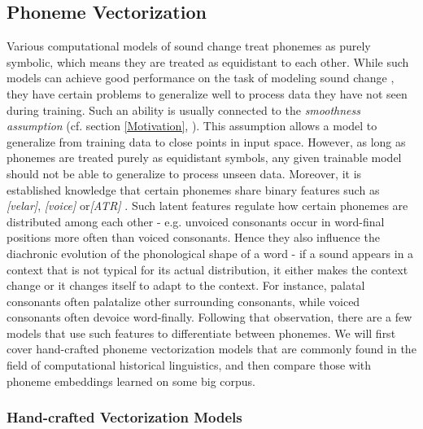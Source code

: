 \documentclass[6pt]{article}
\begin{document}
\subsection{Phoneme Vectorization}
\label{Phoneme Vectorization}
Various computational models of sound change treat phonemes as purely symbolic, which means they are treated as equidistant to each other. While such models can achieve good performance on the task of modeling sound change  \citep{bouchard2007probabilistic,bouchard2013automated}, they have certain problems to generalize well to process data they have not seen during training. Such an ability is usually connected to the \textit{smoothness assumption} (cf. section \ref{Motivation}, \cite[p. 555]{Goodfellow-et-al-2016-Book}). This assumption allows a model to generalize from training data to close points in input space.  However, as long as phonemes are treated purely as equidistant symbols, any given trainable model should not be able to generalize to process unseen data.
Moreover, it is established knowledge that certain phonemes share binary features such as \textit{[velar]}, \textit{[voice]}  or\textit{[ATR]} \citep{chomsky1968sound}. Such latent features regulate how certain phonemes are distributed among each other - e.g. unvoiced consonants occur in word-final positions more often than voiced consonants. Hence they also influence the diachronic evolution of the phonological shape of a word - if a sound appears in a context that is not typical for its actual distribution, it either makes the context change or it changes itself to adapt to the context. For instance, palatal consonants often palatalize other surrounding consonants, while voiced consonants often devoice word-finally.
Following that observation, there are a few models that use such features to differentiate between phonemes. We will first cover hand-crafted phoneme vectorization models that are commonly found in the field of computational historical linguistics, and then compare those with phoneme embeddings learned on some big corpus.

\subsubsection{Hand-crafted Vectorization Models}
\end{document}

